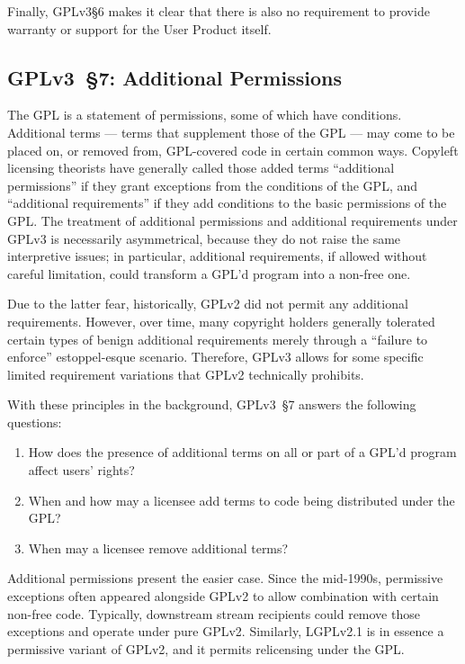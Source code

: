 Finally, GPLv3\S6 makes it clear that there is also no requirement to
provide warranty or support for the User Product itself.

\subsection{GPLv3~\S7: Additional Permissions}
\label{GPLv3s7}

The GPL is a statement of permissions, some of which have conditions.
Additional terms --- terms that supplement those of the GPL --- may come to be
placed on, or removed from, GPL-covered code in certain common ways.
Copyleft licensing theorists have generally called
 those added terms ``additional permissions'' if they grant
exceptions from the conditions of the GPL, and ``additional requirements'' if
they add conditions to the basic permissions of the GPL\@. The treatment of
additional permissions and additional requirements under GPLv3 is necessarily
asymmetrical, because they do not raise the same interpretive
issues; in particular, additional requirements, if allowed without careful
limitation, could transform a GPL'd program into a non-free one.

Due to the latter fear, historically,  GPLv2 did not permit any additional
requirements.  However, over time,
many copyright holders generally tolerated certain types of benign additional requirements
merely through a ``failure to enforce'' estoppel-esque scenario.  Therefore, GPLv3 allows
for some specific limited requirement variations that GPLv2 technically prohibits.

With these principles in the background, GPLv3~\S7  answers the following
questions: 
\begin{enumerate}
\item How does the presence of additional terms on all or part of a GPL'd program
affect users' rights?

\item When and how may a licensee add terms to code being
distributed under the GPL? 

\item When may a licensee remove additional terms?
\end{enumerate}

Additional permissions present the easier case.  Since the mid-1990s,
permissive exceptions often appeared alongside GPLv2 to allow combination
with certain non-free code.  Typically, downstream
stream recipients could remove those exceptions and operate under pure GPLv2.
Similarly, LGPLv2.1 is in essence a permissive variant of GPLv2,
and it permits relicensing under the GPL\@.  

